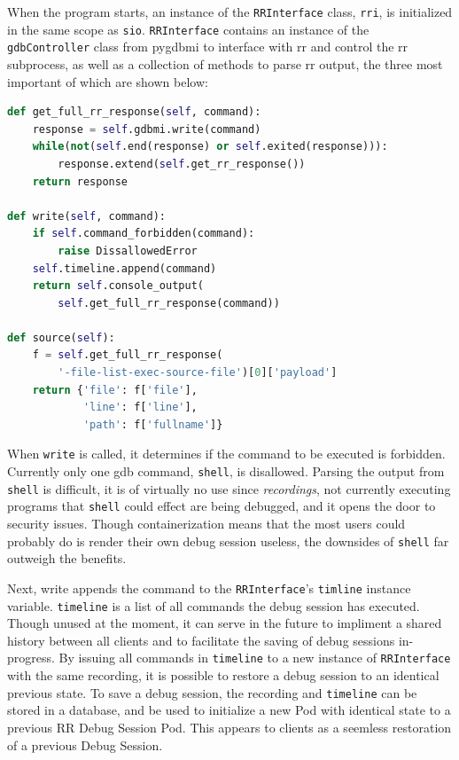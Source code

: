 \documentclass[12pt]{article}
\begin{document}
When the program starts, an instance of the \lstinline{RRInterface}
class, \lstinline{rri}, is initialized in the same scope as
\lstinline{sio}.  \lstinline{RRInterface} contains an instance of the
\lstinline{gdbController} class from pygdbmi to interface with rr and
control the rr subprocess, as well as a collection of methods to parse
rr output, the three most important of which are shown below: 

\begin{lstlisting}[language=Python,basicstyle=\linespread{0.5}\ttfamily,caption={RRInterface},captionpos=b]
def get_full_rr_response(self, command):
    response = self.gdbmi.write(command)
    while(not(self.end(response) or self.exited(response))):
        response.extend(self.get_rr_response())
    return response

def write(self, command):
    if self.command_forbidden(command):
        raise DissallowedError
    self.timeline.append(command)
    return self.console_output(
        self.get_full_rr_response(command))

def source(self):
    f = self.get_full_rr_response(
        '-file-list-exec-source-file')[0]['payload']
    return {'file': f['file'],
            'line': f['line'],
            'path': f['fullname']}
\end{lstlisting}

When \lstinline{write} is called, it determines if the command to be
executed is forbidden.  Currently only one gdb command,
\lstinline{shell}, is disallowed.  Parsing the output from
\lstinline{shell} is difficult, it is of virtually no use since
\textit{recordings}, not currently executing programs that
\lstinline{shell} could effect are being debugged, and it opens the
door to security issues.  Though containerization means that the most
users could probably do is render their own debug session useless, the
downsides of \lstinline{shell} far outweigh the benefits.
\par

Next, write appends the command to the \lstinline{RRInterface}'s
\lstinline{timline} instance variable.  \lstinline{timeline} is a list
of all commands the debug session has executed.  Though unused at the
moment, it can serve in the future to impliment a shared history
between all clients and to facilitate the saving of debug sessions
in-progress.  By issuing all commands in \lstinline{timeline} to a new
instance of \lstinline{RRInterface} with the same recording, it is
possible to restore a debug session to an identical previous state.
To save a debug session, the recording and \lstinline{timeline} can be
stored in a database, and be used to initialize a new Pod with
identical state to a previous RR Debug Session Pod.  This appears to
clients as a seemless restoration of a previous Debug Session.
\par
\end{document}
